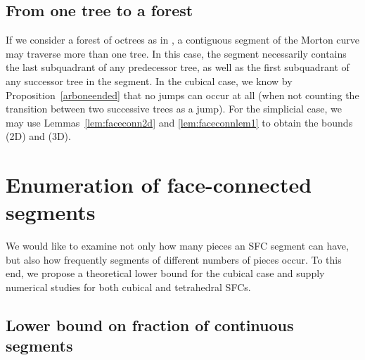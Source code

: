 \documentclass[a4paper,11pt]{article}
\newcommand{\seclab}[1]{\label{sec:#1}}
\begin{document}
\subsection{From one tree to a forest}
\seclab{forest}



If we consider a forest of octrees as in \cite{StewartEdwards04,
BangerthHartmannKanschat07, BursteddeWilcoxGhattas11}, a contiguous segment of
the Morton curve may traverse more than one tree.
In this case, the segment necessarily contains the last subquadrant of any
predecessor tree, as well as the first subquadrant of any successor tree in the
segment.
In the cubical case, we know by Proposition~\ref{arboneended} that no jumps can
occur at all (when not counting the transition between two successive trees as
a jump).
For the simplicial case, we may use Lemmas~\ref{lem:faceconn2d} and
\ref{lem:faceconnlem1} to obtain
the bounds  (2D) and  (3D).


\section{Enumeration of face-connected segments}
\seclab{enumeration}

We would like to examine not only how many pieces an SFC segment can have, but
also how frequently segments of different numbers of pieces occur.
To this end, we propose a theoretical lower bound for the cubical case
and supply numerical studies for both cubical and tetrahedral SFCs.

\subsection{Lower bound on fraction of continuous segments}
\seclab{prooflowerbound}
\end{document}
